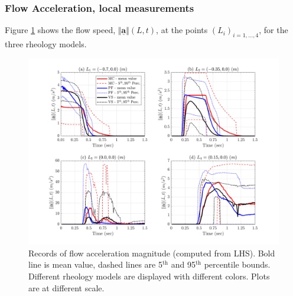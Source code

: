 \documentclass{article}
\begin{document}
\subsubsection{Flow Acceleration, local measurements}
Figure \ref{fig:Ramp-AccL} shows the flow speed, $\Vert \underline{\mathbf{a}} \Vert(L,t)$, at the points $(L_i)_{i=1,\dots,4}$, for the three rheology models.
\begin{figure}[H]
         \centering
        \includegraphics[width=1\textwidth]{InclinedPlane/LocalMeasurments/Acceleration.png}
        \caption{Records of flow acceleration magnitude (computed from LHS). Bold line is mean value, dashed lines are 5$^{\mathrm{th}}$ and 95$^{\mathrm{th}}$ percentile bounds. Different rheology models are displayed with different colors. Plots are at different scale.}
        \label{fig:Ramp-AccL}
\end{figure}
\end{document}
